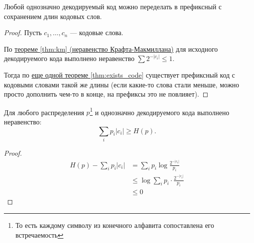 \begin{thm}
    Любой однозначно декодируемый код можно переделать в префиксный с сохранением длин кодовых слов.
\end{thm}
\begin{proof}
	Пусть $  c_1, \ldots , c_n$ --- кодовые слова.

	По \hyperref[thm:km]{теореме \ref{thm:km} (неравенство Крафта-Макмиллана)} для исходного декодируемого кода выполнено неравенство
	$ \sum 2^{-\lvert c_i \rvert } \le 1$.

	Тогда по \hyperref[thm:exists_code]{еще одной теореме \ref{thm:exists_code}} существует префиксный код с кодовыми словами такой же длины (если какие-то слова стали меньше, можно просто дополнить чем-то в конце, на префиксы это не повлияет).

\end{proof}



\newpage
\begin{thm}[Шеннон]
Для любого распределения $ p$\footnote{То есть каждому символу из конечного алфавита сопоставлена его встречаемость} и однозначно декодируемого кода выполнено неравенство:
   \[
	   \sum_{i} p_i \lvert c_i \rvert \ge  H(p) 
   .\] 
\end{thm}
\begin{proof}
	\begin{align*}
		H(p) - \sum_{i}^{} p_i \lvert c_i \rvert &= \sum_{i} p_i \log \frac{2^{-\lvert c_i \rvert }}{p_i} \\
												 & \le  \log \sum_i p_i \cdot \frac{2^{-\lvert c_i \rvert }}{p_i} \tag{Неравенство Йенсена}\\ 
												 & \le  0 \tag{Неравенство Крафта-Макмиллана}
	\end{align*}
\end{proof}


